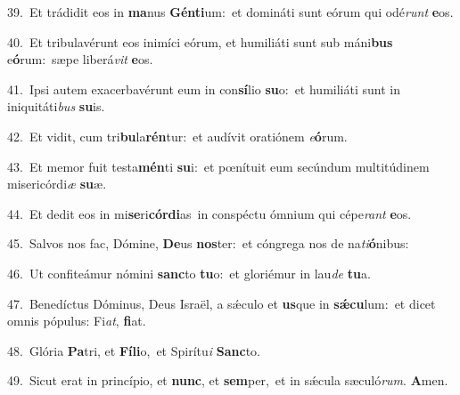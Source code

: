 {\numbfont\textcolor{\numbcolor}{39.}}~Et trádidit eos in \textbf{ma}\-nus \textbf{Gén}\-\textbf{ti}um:~\star et domináti sunt eórum qui odé\textit{runt} \textbf{e}\-os.\par
{\numbfont\textcolor{\numbcolor}{40.}}~Et tribulavérunt eos inimíci eórum, et humiliáti sunt sub máni\textbf{bus} e\-\textbf{ó}\-rum:~\star sæpe liberá\textit{vit} \textbf{e}\-os.\par
{\numbfont\textcolor{\numbcolor}{41.}}~Ipsi autem exacerbavérunt eum in con\-\textbf{sí}\-lio \textbf{su}\-o:~\star et humiliáti sunt in iniquitáti\textit{bus} \textbf{su}\-is.\par
{\numbfont\textcolor{\numbcolor}{42.}}~Et vidit, cum tri\-\textbf{bu}\-la\-\textbf{rén}\-tur:~\star et audívit oratiónem \textit{e}\-\textbf{ó}rum.\par
{\numbfont\textcolor{\numbcolor}{43.}}~Et memor fuit testa\-\textbf{mén}\-ti \textbf{su}\-i:~\star et pœnítuit eum secúndum multitúdinem misericórdi\textit{æ} \textbf{su}\-æ.\par
{\numbfont\textcolor{\numbcolor}{44.}}~Et dedit eos in mi\-\textbf{se}\-ri\-\textbf{cór}\-\textbf{di}as~\star in conspéctu ómnium qui cépe\textit{rant} \textbf{e}\-os.\par
{\numbfont\textcolor{\numbcolor}{45.}}~Salvos nos fac, Dómine, \textbf{De}\-us \textbf{nos}\-ter:~\star et cóngrega nos de na\-\textit{ti}\-\textbf{ó}nibus:\par
{\numbfont\textcolor{\numbcolor}{46.}}~Ut confiteámur nómini \textbf{sanc}\-to \textbf{tu}\-o:~\star et gloriémur in lau\textit{de} \textbf{tu}\-a.\par
{\numbfont\textcolor{\numbcolor}{47.}}~Benedíctus Dóminus, Deus Israël, a sǽculo et \textbf{us}\-que in \textbf{sǽ}\-\textbf{cu}lum:~\star et dicet omnis pópulus: Fi\-\textit{at}\-, \textbf{fi}\-at.\par
{\numbfont\textcolor{\numbcolor}{48.}}~Glória \textbf{Pa}\-tri, et \textbf{Fí}\-\textbf{li}o,~\star et Spirítu\textit{i} \textbf{Sanc}\-to.\par
{\numbfont\textcolor{\numbcolor}{49.}}~Sicut erat in princípio, et \textbf{nunc}\-, et \textbf{sem}\-per,~\star et in sǽcula sæculó\-\textit{rum}\-. \textbf{A}\-men.\par
